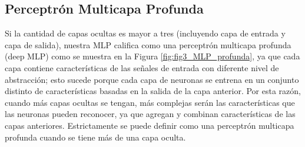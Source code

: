 \begin{onehalfspacing}
	

\subsection{Perceptrón Multicapa Profunda}
\label{MLP_Profunda}

Si la cantidad de capas ocultas es mayor a tres (incluyendo capa de entrada y capa de salida), nuestra MLP califica como una perceptrón multicapa profunda (deep MLP) como se muestra en la Figura \ref{fig:fig3_MLP_profunda}, ya que cada capa contiene características de las señales de entrada con diferente nivel de abstracción; esto sucede porque cada capa de neuronas se entrena en un conjunto distinto de características basadas en la salida de la capa  anterior. Por esta razón, cuando más capas ocultas se tengan, más complejas serán las características que las neuronas pueden reconocer, ya que agregan y combinan características de las capas anteriores. Estrictamente se puede definir como una perceptrón multicapa profunda cuando se tiene más de una capa oculta.
	


\end{onehalfspacing}
